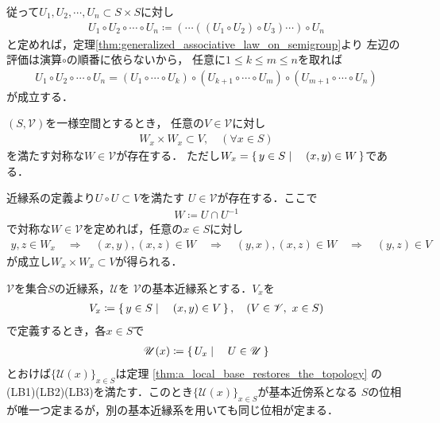 	従って$U_1,U_2,\cdots,U_n \subset S \times S$に対し
	\begin{align}
		U_1 \circ U_2 \circ \cdots \circ U_n
		\coloneqq (\cdots((U_1 \circ U_2) \circ U_3) \cdots ) \circ U_n
	\end{align}
	と定めれば，定理\ref{thm:generalized_associative_law_on_semigroup}より
	左辺の評価は演算$\circ$の順番に依らないから，
	任意に$1 \leq k \leq m \leq n$を取れば
	\begin{align}
		U_1 \circ U_2 \circ \cdots \circ U_n
		= (U_1 \circ \cdots \circ U_k) 
		\circ (U_{k+1} \circ \cdots \circ U_m)
		\circ (U_{m+1} \circ \cdots \circ U_n)
	\end{align}
	が成立する．
	
	\begin{screen}
		\begin{thm}\label{thm:uniform_structure}
			$(S,\mathscr{V})$を一様空間とするとき，
			任意の$V \in \mathscr{V}$に対し
			\begin{align}
				W_x \times W_x \subset V,\quad (\forall x \in S)
			\end{align}
			を満たす対称な$W \in \mathscr{V}$が存在する．
			ただし$W_x = \left\{\, y \in S \mid \quad (x,y) \in W\, \right\}$である．
		\end{thm}
	\end{screen}
	
	\begin{prf}
		近縁系の定義より$U \circ U \subset V$を満たす
		$U \in \mathscr{V}$が存在する．ここで
		\begin{align}
			W \coloneqq U \cap U^{-1}
		\end{align}
		で対称な$W \in \mathscr{V}$を定めれば，任意の$x \in S$に対し
		\begin{align}
			y,z \in W_x \quad \Longrightarrow \quad
			(x,y),(x,z) \in W \quad \Longrightarrow \quad
			(y,x),(x,z) \in W \quad \Longrightarrow \quad
			(y,z) \in V
		\end{align}
		が成立し$W_x \times W_x \subset V$が得られる．
		\QED
	\end{prf}
	
	\begin{screen}
		\begin{thm}[近縁系で導入する位相]\label{thm:topology_induced_by_the_uniformity}
			$\mathscr{V}$を集合$S$の近縁系，$\mathscr{U}$を
			$\mathscr{V}$の基本近縁系とする．$V_x$を
			\begin{align}
				V_x \coloneqq \left\{\, y \in S \mid \quad (x,y) \in V\, \right\},
				\quad (V \in \mathscr{V},\ x \in S)
			\end{align}
			で定義するとき，各$x \in S$で
			\begin{align}
				\mathscr{U}(x) \coloneqq \left\{\, U_x \mid \quad U \in \mathscr{U}\, \right\}
			\end{align}
			とおけば$\{\mathscr{U}(x)\}_{x \in S}$は定理
			\ref{thm:a_local_base_restores_the_topology}
			の(LB1)(LB2)(LB3)を満たす．このとき$\{\mathscr{U}(x)\}_{x \in S}$が基本近傍系となる
			$S$の位相が唯一つ定まるが，別の基本近縁系を用いても同じ位相が定まる．
		\end{thm}
	\end{screen}
	
